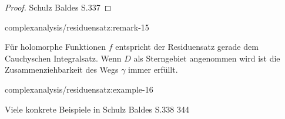 \begin{proof}
 Schulz Baldes S.337
\end{proof}
\begin{remark}{}{complexanalysis/residuensatz:remark-15}



\par
Für holomorphe Funktionen \(f\) entspricht der Residuensatz gerade dem Cauchyschen Integralsatz.
Wenn \(D\) als Sterngebiet angenommen wird ist die Zusammenziehbarkeit des Wegs \(\gamma\) immer erfüllt.
\end{remark}
\begin{example}{}{complexanalysis/residuensatz:example-16}



\par
Viele konkrete Beispiele in Schulz Baldes S.338 344
\end{example}


